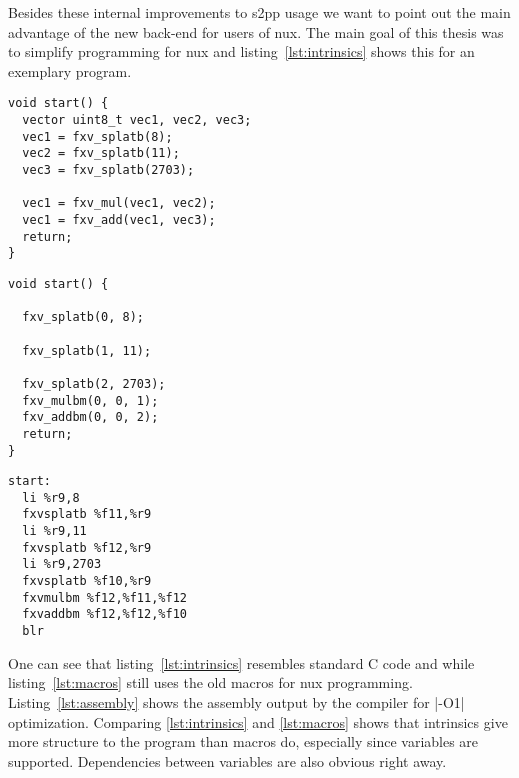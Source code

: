 Besides these internal improvements to \ac{s2pp} usage we want to point out the main advantage of the new back-end for users of nux.
The main goal of this thesis was to simplify programming for nux and listing~\ref{lst:intrinsics} shows this for an exemplary program.
\begin{adjustbox}{center, width=1.1\textwidth}
\lstset{numbers=none}
    \begin{minipage}[t]{.4\textwidth}
    \begin{lstlisting}[caption={Code with Intrinsics}, label=lst:intrinsics]
void start() {
  vector uint8_t vec1, vec2, vec3;
  vec1 = fxv_splatb(8);	
  vec2 = fxv_splatb(11);	
  vec3 = fxv_splatb(2703);	
  
  vec1 = fxv_mul(vec1, vec2);
  vec1 = fxv_add(vec1, vec3);
  return;
} 
\end{lstlisting}
\end{minipage}
\begin{minipage}[t]{.3\textwidth}
\begin{lstlisting}[caption={Code With Macros}, label=lst:macros]
void start() {

  fxv_splatb(0, 8);

  fxv_splatb(1, 11);

  fxv_splatb(2, 2703);
  fxv_mulbm(0, 0, 1);
  fxv_addbm(0, 0, 2);
  return;
} 
\end{lstlisting}
\end{minipage}\begin{minipage}[t]{.4\textwidth}
    \begin{lstlisting}[caption={Assembly Output for \ref{lst:intrinsics}}, label=lst:assembly]
start:
  li %r9,8
  fxvsplatb %f11,%r9
  li %r9,11
  fxvsplatb %f12,%r9
  li %r9,2703	
  fxvsplatb %f10,%r9
  fxvmulbm %f12,%f11,%f12	
  fxvaddbm %f12,%f12,%f10
  blr
\end{lstlisting}
\end{minipage}
\end{adjustbox}

One can see that listing~\ref{lst:intrinsics} resembles standard C code and while listing~\ref{lst:macros} still uses the old macros for nux programming.
Listing~\ref{lst:assembly} shows the assembly output by the compiler for |-O1| optimization.
Comparing \ref{lst:intrinsics} and \ref{lst:macros} shows that intrinsics give more structure to the program than macros do, especially since variables are supported.
Dependencies between variables are also obvious right away.

